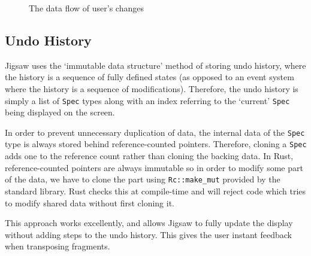 \documentclass[12pt]{article}
\begin{document}
\begin{figure}
    \caption{The data flow of user's changes}\label{fig:app-data-flow}
\end{figure}

\subsection{Undo History}

Jigsaw uses the `immutable data structure' method of storing undo history, where the history is a
sequence of fully defined states (as opposed to an event system where the history is a sequence of
modifications).  Therefore, the undo history is simply a list of \verb|Spec| types along with an
index referring to the `current' \verb|Spec| being displayed on the screen.

In order to prevent unnecessary duplication of data, the internal data of the \verb|Spec| type is
always stored behind reference-counted pointers.  Therefore, cloning a \verb|Spec| adds one to the
reference count rather than cloning the backing data.  In Rust, reference-counted pointers are
always immutable so in order to modify some part of the data, we have to clone the part using
\verb|Rc::make_mut| provided by the standard library.  Rust checks this at compile-time and will
reject code which tries to modify shared data without first cloning it.

This approach works excellently, and allows Jigsaw to fully update the display without adding steps
to the undo history.  This gives the user instant feedback when transposing fragments.
\end{document}
